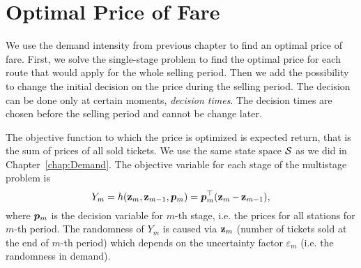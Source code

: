 \chapter{Optimal Price of Fare}
	\label{chap:optimalPrice}
	
We use the demand intensity from previous chapter to find an optimal price of fare. First, we solve the single-stage problem to find the optimal price for each route that would apply for the whole selling period. Then we add the possibility to change the initial decision on the price during the selling period. The decision can be done only at certain moments, \emph{decision times}. The decision times are chosen before the selling period and cannot be change later.

The objective function to which the price is optimized is expected return, that is the sum of prices of all sold tickets. We use the same state space $\S$ as we did in Chapter~\ref{chap:Demand}. The objective variable for each stage of the multistage problem is
\[
	Y_m = h (\z_m, \z_{m-1}, \m{p}_{m}) = \m{p}_{m}^{\top} (\z_m - \z_{m-1}),
\]
where $\m{p}_m$ is the decision variable for $m$-th stage, i.e. the prices for all stations for $m$-th period. The randomness of $Y_m$ is caused via $\z_m$ (number of tickets sold at the end of $m$-th period) which depends on the uncertainty factor $\varepsilon_m$ (i.e. the randomness in demand).

